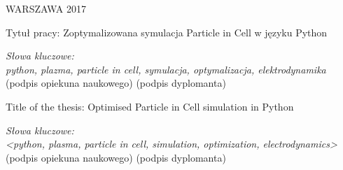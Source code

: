 WARSZAWA 2017 %

\newpage
\thispagestyle{empty}
\phantom{Nothing here}
\newpage
\clearpage
\phantom{Here neither}

\setcounter{page}{3}
\vspace{-1.5cm}
\begin{flushleft}
	Tytuł pracy: Zoptymalizowana symulacja Particle in Cell w języku Python %
\end{flushleft}
\vspace{0.5cm}
\lipsum[1-4] %
\vspace{0.5cm}
\noindent \textit{Słowa kluczowe: \\ python, plazma, particle in cell, symulacja, optymalizacja, elektrodynamika} %
\vfill
(podpis opiekuna naukowego) \hfill (podpis dyplomanta)

\newpage
\thispagestyle{empty}
\phantom{Nothing here}
\newpage
\clearpage
\phantom{Here neither}

\setcounter{page}{5}
\vspace{-1.5cm}
\begin{flushleft}
	Title of the thesis: Optimised Particle in Cell simulation in Python %
\end{flushleft}
\vspace{0.5cm}
\lipsum[1-4] %
\vspace{0.5cm}
\noindent \textit{Słowa kluczowe: \\ <python, plasma, particle in cell, simulation, optimization, electrodynamics>} %
\vfill
(podpis opiekuna naukowego) \hfill (podpis dyplomanta)

\newpage
\thispagestyle{empty}
\phantom{Nothing here}
\newpage
\clearpage
\phantom{Here neither}

